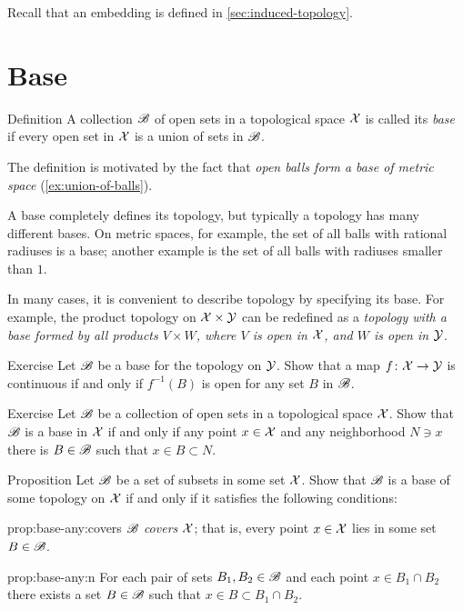 Recall that an embedding is defined in \ref{sec:induced-topology}.

\section{Base}

\begin{thm}{Definition}\label{def:base}
A collection $\mathscr{B}$ of open sets in a topological space $\mathcal{X}$ is called its \emph{base} if every open set in $\mathcal{X}$ is a union of sets in $\mathscr{B}$.
\end{thm}

The definition is motivated by the fact that \textit{open balls form a base of metric space} (\ref{ex:union-of-balls}).

A base completely defines its topology,
but typically a topology has many different bases.
On metric spaces, for example, the set of all balls with rational radiuses is a base;
another example is the set of all  balls with radiuses smaller than $1$.

In many cases, it is convenient to describe topology by specifying its base.
For example, the product topology on $\mathcal{X}\times\mathcal{Y}$ can be redefined as a \textit{topology with a base formed by all products $V\times W$, where $V$ is open in $\mathcal{X}$, and $W$ is open in $\mathcal{Y}$}.

\begin{thm}{Exercise}\label{ex:base}
Let $\mathscr{B}$ be a base for the topology on $\mathcal{Y}$.
Show that a map $f\colon \mathcal{X} \to \mathcal{Y}$ is continuous if and only if $f^{-1}(B)$ is open for any set $B$ in $\mathscr{B}$.

\end{thm}



\begin{thm}{Exercise}\label{ex:base-nbhd}
Let $\mathscr{B}$ be a collection of open sets in a topological space $\mathcal{X}$.
Show that $\mathscr{B}$ is a base in $\mathcal{X}$ if and only if any point $x\in \mathcal{X}$ and any neighborhood $N\ni x$ there is $B\in\mathscr{B}$ such that $x\in B\subset N$.
\end{thm}

\begin{thm}{Proposition}\label{prop:base-any}
Let $\mathscr{B}$ be a set of subsets in some set $\mathcal{X}$.
Show that $\mathscr{B}$ is a base of some topology on $\mathcal{X}$ if and only if it satisfies the following conditions:

\begin{subthm}{prop:base-any:covers}
$\mathscr{B}$ {}\emph{covers} $\mathcal{X}$;
that is, every point $x\in\mathcal{X}$ lies in some set $B\in \mathscr{B}$.
\end{subthm}

\begin{subthm}{prop:base-any:n}
For each pair of sets $B_1, B_2\in \mathscr{B}$ and each point $x \in B_1 \cap B_2$ there exists a set $B
\in \mathscr{B}$ such that $x\in B\subset B_1 \cap B_2$.
\end{subthm}

\end{thm}

